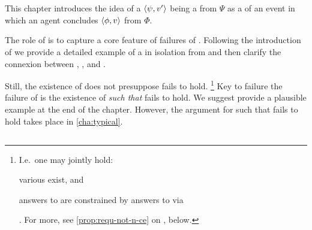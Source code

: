 \chapter{}
\label{cha:requs}

\begin{note}
  This chapter introduces the idea of a \(\langle \psi, v' \rangle\) being a \fc{} from \(\Psi\) as a  of an event in which an agent concludes \(\langle \phi, v \rangle\) from \(\Phi\).

  The role of  is to capture a core feature of failures of \issueConstraint{}.
  Following the introduction of  we provide a detailed example of a  in isolation from \issueConstraint{} and then clarify the connexion between , \qWhyV{}, and \issueConstraint{}.

  Still, the existence of  does not presuppose \issueConstraint{} fails to hold.%
  \footnote{
    I.e.\ one may jointly hold:
    \begin{enumerate*}[label=(\alph*)]
    \item
      various  exist, and
    \item
      answers to \qWhyV{} are constrained by answers to \qHowV{} via \issueConstraint{}
    \end{enumerate*}%
    .
    For more, see \autoref{prop:requ-not-n-ce} on , below.
  }
  Key to failure the failure of \issueConstraint{} is the existence of  \emph{such that} \issueConstraint{} fails to hold.
  We suggest provide a plausible example at the end of the chapter.
  However, the argument for  such that \issueConstraint{} fails to hold takes place in \autoref{cha:typical}.
\end{note}



\section{}
\label{cha:requs:requs}

